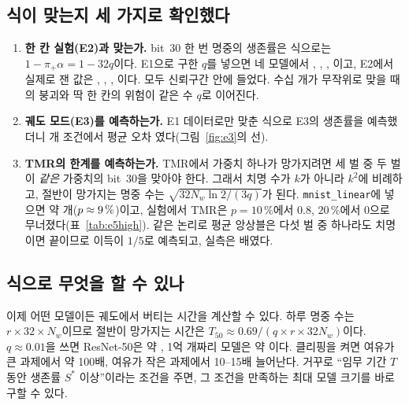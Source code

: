 \documentclass[11pt,a4paper]{article}
\newcommand{\code}[1]{\texttt{#1}}
\begin{document}
\subsection{식이 맞는지 세 가지로 확인했다}
\begin{enumerate}[leftmargin=*]
  \item \textbf{한 칸 실험(E2)과 맞는가.} bit~30 한 번 명중의 생존률은 식으로는 $1-\pi_+\alpha=1-32q$이다. E1으로 구한 $q$를 넣으면 네 모델에서 \SthirtyPredLinear{}, \SthirtyPredCnn{}, \SthirtyPredCifar{}, \SthirtyPredResnet{}이고, E2에서 실제로 잰 값은 \SthirtyEtwoLinear{}, \SthirtyEtwoCnn{}, \SthirtyEtwoCifar{}, \SthirtyEtwoResnet{}이다. 모두 신뢰구간 안에 들었다. 수십 개가 무작위로 맞을 때의 붕괴와 딱 한 칸의 위험이 같은 수 $q$로 이어진다.
  \item \textbf{궤도 모드(E3)를 예측하는가.} E1 데이터로만 맞춘 식으로 E3의 생존률을 예측했더니 \EthreeN{}개 조건에서 평균 오차 \EthreeMAE{}였다(그림~\ref{fig:e3}의 선).
  \item \textbf{TMR의 한계를 예측하는가.} TMR에서 가중치 하나가 망가지려면 세 벌 중 두 벌이 \emph{같은} 가중치의 bit~30을 맞아야 한다. 그래서 치명 수가 $k$가 아니라 $k^2$에 비례하고, 절반이 망가지는 명중 수는 $\sqrt{32N_w\ln2/(3q)}$가 된다. \code{mnist\_linear}에 넣으면 약 \KfiftyTmrPred{}개($p\approx9\,\%$)이고, 실험에서 TMR은 $p=10\,\%$에서 0.8, $20\,\%$에서 0으로 무너졌다(표~\ref{tab:e5high}). 같은 논리로 평균 앙상블은 다섯 벌 중 하나라도 치명이면 끝이므로 이득이 $1/5$로 예측되고, 실측은 \GainEEns{}배였다.
\end{enumerate}

\subsection{식으로 무엇을 할 수 있나}
이제 어떤 모델이든 궤도에서 버티는 시간을 계산할 수 있다. 하루 명중 수는 $r\times32\times N_w$이므로 절반이 망가지는 시간은 $T_{50}\approx0.69/(q\times r\times32N_w)$이다. $q\approx0.01$을 쓰면 ResNet-50은 약 \TfiftyResnetFifty{}, 1억 개짜리 모델은 약 \TfiftyHundredMMin{}이다. 클리핑을 켜면 여유가 큰 과제에서 약 100배, 여유가 작은 과제에서 10--15배 늘어난다. 거꾸로 ``임무 기간 $T$ 동안 생존률 $S^\ast$ 이상''이라는 조건을 주면, 그 조건을 만족하는 최대 모델 크기를 바로 구할 수 있다.

\end{document}
